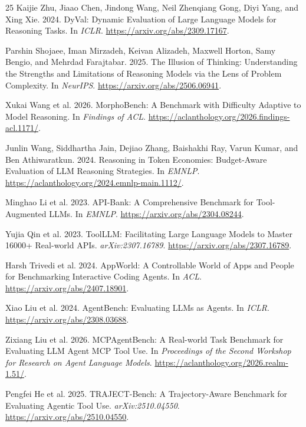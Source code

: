 \documentclass[sigconf,nonacm]{acmart}
\begin{document}
\begin{thebibliography}{25}
Kaijie Zhu, Jiaao Chen, Jindong Wang, Neil Zhenqiang Gong, Diyi Yang,
and Xing Xie. 2024.
DyVal: Dynamic Evaluation of Large Language Models for Reasoning Tasks.
In \emph{ICLR}. \url{https://arxiv.org/abs/2309.17167}.

Parshin Shojaee, Iman Mirzadeh, Keivan Alizadeh, Maxwell Horton,
Samy Bengio, and Mehrdad Farajtabar. 2025.
The Illusion of Thinking: Understanding the Strengths and Limitations of
Reasoning Models via the Lens of Problem Complexity.
In \emph{NeurIPS}. \url{https://arxiv.org/abs/2506.06941}.

Xukai Wang et al. 2026.
MorphoBench: A Benchmark with Difficulty Adaptive to Model Reasoning.
In \emph{Findings of ACL}. \url{https://aclanthology.org/2026.findings-acl.1171/}.

Junlin Wang, Siddhartha Jain, Dejiao Zhang, Baishakhi Ray, Varun Kumar,
and Ben Athiwaratkun. 2024.
Reasoning in Token Economies: Budget-Aware Evaluation of LLM Reasoning
Strategies. In \emph{EMNLP}. \url{https://aclanthology.org/2024.emnlp-main.1112/}.

Minghao Li et al. 2023.
API-Bank: A Comprehensive Benchmark for Tool-Augmented LLMs.
In \emph{EMNLP}. \url{https://arxiv.org/abs/2304.08244}.

Yujia Qin et al. 2023.
ToolLLM: Facilitating Large Language Models to Master 16000+ Real-world APIs.
\emph{arXiv:2307.16789}. \url{https://arxiv.org/abs/2307.16789}.

Harsh Trivedi et al. 2024.
AppWorld: A Controllable World of Apps and People for Benchmarking
Interactive Coding Agents. In \emph{ACL}.
\url{https://arxiv.org/abs/2407.18901}.

Xiao Liu et al. 2024.
AgentBench: Evaluating LLMs as Agents. In \emph{ICLR}.
\url{https://arxiv.org/abs/2308.03688}.

Zixiang Liu et al. 2026.
MCPAgentBench: A Real-world Task Benchmark for Evaluating LLM Agent MCP Tool Use.
In \emph{Proceedings of the Second Workshop for Research on Agent Language
Models}. \url{https://aclanthology.org/2026.realm-1.51/}.

Pengfei He et al. 2025.
TRAJECT-Bench: A Trajectory-Aware Benchmark for Evaluating Agentic Tool Use.
\emph{arXiv:2510.04550}. \url{https://arxiv.org/abs/2510.04550}.


\end{thebibliography}
\end{document}
